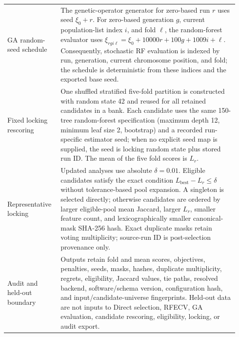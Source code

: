 {\begin{longtable}{@{}>{\raggedright\arraybackslash}p{0.205\linewidth}>{\raggedright\arraybackslash}p{0.735\linewidth}@{}}
GA random-seed schedule & The genetic-operator generator for zero-based run $r$ uses seed $\xi_0+r$. For zero-based generation $g$, current population-list index $i$, and fold $\ell$, the random-forest evaluator uses $\xi_{rgi\ell}=\xi_0+10000r+100g+1009i+\ell$. Consequently, stochastic RF evaluation is indexed by run, generation, current chromosome position, and fold; the schedule is deterministic from these indices and the exported base seed. \\
Fixed locking rescoring & One shuffled stratified five-fold partition is constructed with random state 42 and reused for all retained candidates in a bank. Each candidate uses the same 150-tree random-forest specification (maximum depth 12, minimum leaf size 2, bootstrap) and a recorded run-specific estimator seed; when no explicit seed map is supplied, the seed is locking random state plus stored run ID. The mean of the five fold scores is $L_r$. \\
Representative locking & Updated analyses use absolute $\delta=0.01$. Eligible candidates satisfy the exact condition $L_{\mathrm{best}}-L_r\leq\delta$ without tolerance-based pool expansion. A singleton is selected directly; otherwise candidates are ordered by larger eligible-pool mean Jaccard, larger $L_r$, smaller feature count, and lexicographically smaller canonical-mask SHA-256 hash. Exact duplicate masks retain voting multiplicity; source-run ID is post-selection provenance only. \\
Audit and held-out boundary & Outputs retain fold and mean scores, objectives, penalties, seeds, masks, hashes, duplicate multiplicity, regrets, eligibility, Jaccard values, tie paths, resolved backend, software/schema version, configuration hash, and input/candidate-universe fingerprints. Held-out data are not inputs to Direct selection, RFECV, GA evaluation, candidate rescoring, eligibility, locking, or audit export. \\
\end{longtable}
}
